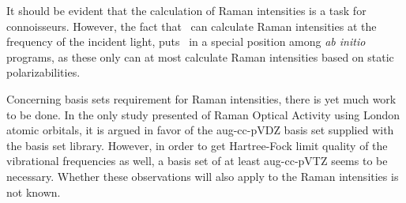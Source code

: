 It should be evident that the calculation of Raman intensities is
a task for connoisseurs. However, the fact that \siraba\ can
calculate Raman intensities at the frequency of the incident
light, puts \siraba\ in a special position among {\em ab initio}
programs, as these only can  at most calculate Raman intensities
based on static polarizabilities.

Concerning basis sets requirement for Raman intensities,  there is
yet much work to be done. In the only study presented of Raman
Optical Activity using London atomic orbitals, it is argued in
favor of the aug-cc-pVDZ basis set supplied with the basis set
library. However, in order to get Hartree-Fock limit quality of
the vibrational frequencies as well, a basis set of at least
aug-cc-pVTZ seems to be necessary. Whether these observations will
also apply to the Raman intensities is not known.

